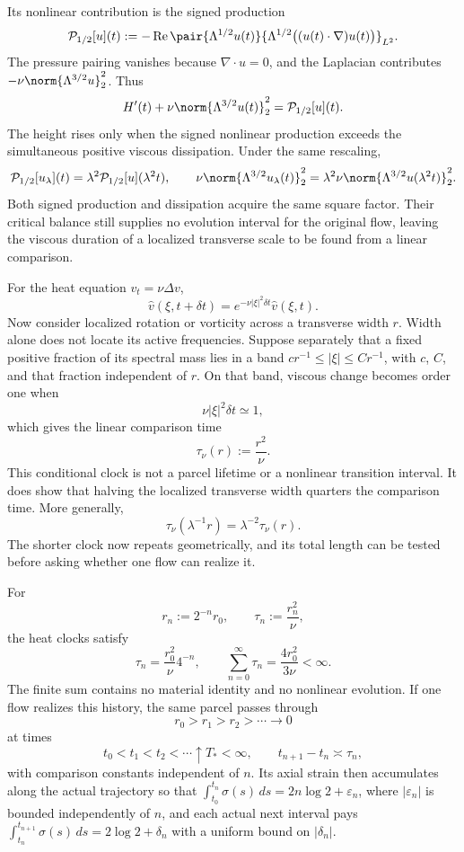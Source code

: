 
Its nonlinear contribution is the signed production
\[
  \mathcal P_{1/2}[u](t)
  :=
  -\operatorname{Re}
  \pair
    {\Lambda^{1/2}u(t)}
    {\Lambda^{1/2}\bigl((u(t)\cdot\nabla)u(t)\bigr)}_{L^2}.
\]
The pressure pairing vanishes because \(\nabla\cdot u=0\), and the Laplacian contributes \(-\nu\norm{\Lambda^{3/2}u}_2^2\). Thus
\[
  H'(t)
  +
  \nu\norm{\Lambda^{3/2}u(t)}_2^2
  =
  \mathcal P_{1/2}[u](t).
\]
The height rises only when the signed nonlinear production exceeds the simultaneous positive viscous dissipation. Under the same rescaling,
\[
  \mathcal P_{1/2}[u_\lambda](t)
  =
  \lambda^2\mathcal P_{1/2}[u](\lambda^2t),
  \qquad
  \nu\norm{\Lambda^{3/2}u_\lambda(t)}_2^2
  =
  \lambda^2\nu\norm{\Lambda^{3/2}u(\lambda^2t)}_2^2.
\]
Both signed production and dissipation acquire the same square factor. Their critical balance still supplies no evolution interval for the original flow, leaving the viscous duration of a localized transverse scale to be found from a linear comparison.


For the heat equation \(v_t=\nu\Delta v\),
\[
  \widehat v(\xi,t+\delta t)
  =
  e^{-\nu|\xi|^2\delta t}\widehat v(\xi,t).
\]
Now consider localized rotation or vorticity across a transverse width \(r\). Width alone does not locate its active frequencies. Suppose separately that a fixed positive fraction of its spectral mass lies in a band \(c r^{-1}\leq|\xi|\leq C r^{-1}\), with \(c\), \(C\), and that fraction independent of \(r\). On that band, viscous change becomes order one when
\[
  \nu|\xi|^2\delta t\simeq1,
\]
which gives the linear comparison time
\[
  \tau_\nu(r)
  :=
  \frac{r^2}{\nu}.
\]
This conditional clock is not a parcel lifetime or a nonlinear transition interval. It does show that halving the localized transverse width quarters the comparison time. More generally,
\[
  \tau_\nu(\lambda^{-1}r)
  =
  \lambda^{-2}\tau_\nu(r).
\]
The shorter clock now repeats geometrically, and its total length can be tested before asking whether one flow can realize it.


For
\[
  r_n:=2^{-n}r_0,
  \qquad
  \tau_n:=\frac{r_n^2}{\nu},
\]
the heat clocks satisfy
\[
  \tau_n
  =
  \frac{r_0^2}{\nu}4^{-n},
  \qquad
  \sum_{n=0}^{\infty}\tau_n
  =
  \frac{4r_0^2}{3\nu}
  <
  \infty.
\]
The finite sum contains no material identity and no nonlinear evolution. If one \NavierStokes{} flow realizes this history, the same parcel passes through
\[
  r_0>r_1>r_2>\cdots\longrightarrow0
\]
at times
\[
  t_0<t_1<t_2<\cdots\uparrow T_*<\infty,
  \qquad
  t_{n+1}-t_n\asymp\tau_n,
\]
with comparison constants independent of \(n\). Its axial strain then accumulates along the actual trajectory so that \(\int_{t_0}^{t_n}\sigma(s)\,ds=2n\log 2+\varepsilon_n\), where \(|\varepsilon_n|\) is bounded independently of \(n\), and each actual next interval pays \(\int_{t_n}^{t_{n+1}}\sigma(s)\,ds=2\log 2+\delta_n\) with a uniform bound on \(|\delta_n|\).

